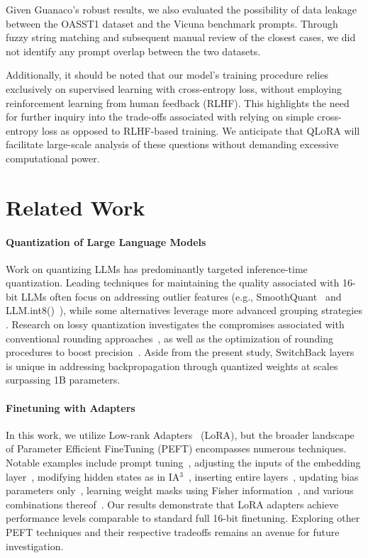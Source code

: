 Given {Guanaco}’s robust results, we also evaluated the possibility of data leakage between the OASST1 dataset and the Vicuna benchmark prompts. Through fuzzy string matching and subsequent manual review of the closest cases, we did not identify any prompt overlap between the two datasets.

Additionally, it should be noted that our model's training procedure relies exclusively on supervised learning with cross-entropy loss, without employing reinforcement learning from human feedback (RLHF). This highlights the need for further inquiry into the trade-offs associated with relying on simple cross-entropy loss as opposed to RLHF-based training. We anticipate that \textsc{QLoRA} will facilitate large-scale analysis of these questions without demanding excessive computational power.

\section{Related Work}

\paragraph{Quantization of Large Language Models} Work on quantizing LLMs has predominantly targeted inference-time quantization. Leading techniques for maintaining the quality associated with 16-bit LLMs often focus on addressing outlier features (e.g., SmoothQuant~\citep{xiao2022smoothquant} and LLM.int8()~\citep{dettmers2022llm}), while some alternatives leverage more advanced grouping strategies \citep{park2022nuqmm, yao2022zeroquant}. Research on lossy quantization investigates the compromises associated with conventional rounding approaches~\citep{dettmers2022case,zeng2022glm,pope2022efficiently}, as well as the optimization of rounding procedures to boost precision~\citep{frantar2022gptq}. Aside from the present study, SwitchBack layers~\citep{wortsman2023stable} is unique in addressing backpropagation through quantized weights at scales surpassing 1B parameters.

\paragraph{Finetuning with Adapters} In this work, we utilize Low-rank Adapters~\citep{hu2021lora} (LoRA), but the broader landscape of Parameter Efficient FineTuning (PEFT) encompasses numerous techniques. Notable examples include prompt tuning~\citep{qin2021learning,lester2021power,li2021prefix}, adjusting the inputs of the embedding layer~\citep{an2022input}, modifying hidden states as in IA$^3$~\citep{liu2022few}, inserting entire layers~\citep{houlsby2019parameter}, updating bias parameters only~\citep{zaken2021bitfit}, learning weight masks using Fisher information~\citep{sung2021training}, and various combinations thereof~\citep{henderson2021compacter}. Our results demonstrate that LoRA adapters achieve performance levels comparable to standard full 16-bit finetuning. Exploring other PEFT techniques and their respective tradeoffs remains an avenue for future investigation.

